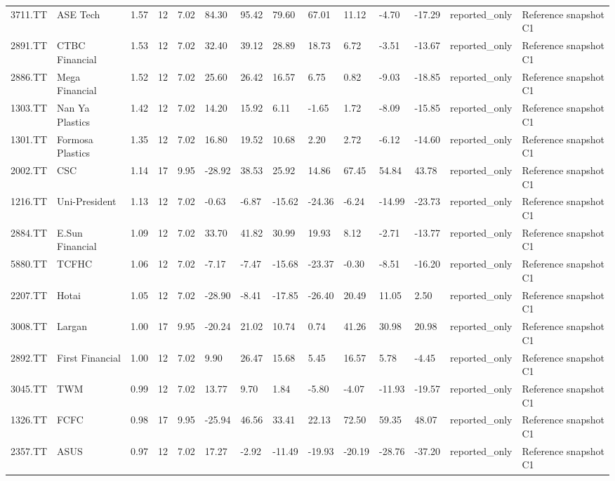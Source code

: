 \begin{landscape}
\begin{longtable}{llllllllllllll}
3711.TT & ASE Tech & 1.57 & 12 & 7.02 & 84.30 & 95.42 & 79.60 & 67.01 & 11.12 & -4.70 & -17.29 & reported\_only & Reference snapshot C1 \\
2891.TT & CTBC Financial & 1.53 & 12 & 7.02 & 32.40 & 39.12 & 28.89 & 18.73 & 6.72 & -3.51 & -13.67 & reported\_only & Reference snapshot C1 \\
2886.TT & Mega Financial & 1.52 & 12 & 7.02 & 25.60 & 26.42 & 16.57 & 6.75 & 0.82 & -9.03 & -18.85 & reported\_only & Reference snapshot C1 \\
1303.TT & Nan Ya Plastics & 1.42 & 12 & 7.02 & 14.20 & 15.92 & 6.11 & -1.65 & 1.72 & -8.09 & -15.85 & reported\_only & Reference snapshot C1 \\
1301.TT & Formosa Plastics & 1.35 & 12 & 7.02 & 16.80 & 19.52 & 10.68 & 2.20 & 2.72 & -6.12 & -14.60 & reported\_only & Reference snapshot C1 \\
2002.TT & CSC & 1.14 & 17 & 9.95 & -28.92 & 38.53 & 25.92 & 14.86 & 67.45 & 54.84 & 43.78 & reported\_only & Reference snapshot C1 \\
1216.TT & Uni-President & 1.13 & 12 & 7.02 & -0.63 & -6.87 & -15.62 & -24.36 & -6.24 & -14.99 & -23.73 & reported\_only & Reference snapshot C1 \\
2884.TT & E.Sun Financial & 1.09 & 12 & 7.02 & 33.70 & 41.82 & 30.99 & 19.93 & 8.12 & -2.71 & -13.77 & reported\_only & Reference snapshot C1 \\
5880.TT & TCFHC & 1.06 & 12 & 7.02 & -7.17 & -7.47 & -15.68 & -23.37 & -0.30 & -8.51 & -16.20 & reported\_only & Reference snapshot C1 \\
2207.TT & Hotai & 1.05 & 12 & 7.02 & -28.90 & -8.41 & -17.85 & -26.40 & 20.49 & 11.05 & 2.50 & reported\_only & Reference snapshot C1 \\
3008.TT & Largan & 1.00 & 17 & 9.95 & -20.24 & 21.02 & 10.74 & 0.74 & 41.26 & 30.98 & 20.98 & reported\_only & Reference snapshot C1 \\
2892.TT & First Financial & 1.00 & 12 & 7.02 & 9.90 & 26.47 & 15.68 & 5.45 & 16.57 & 5.78 & -4.45 & reported\_only & Reference snapshot C1 \\
3045.TT & TWM & 0.99 & 12 & 7.02 & 13.77 & 9.70 & 1.84 & -5.80 & -4.07 & -11.93 & -19.57 & reported\_only & Reference snapshot C1 \\
1326.TT & FCFC & 0.98 & 17 & 9.95 & -25.94 & 46.56 & 33.41 & 22.13 & 72.50 & 59.35 & 48.07 & reported\_only & Reference snapshot C1 \\
2357.TT & ASUS & 0.97 & 12 & 7.02 & 17.27 & -2.92 & -11.49 & -19.93 & -20.19 & -28.76 & -37.20 & reported\_only & Reference snapshot C1 \\

\end{longtable}
\end{landscape}

